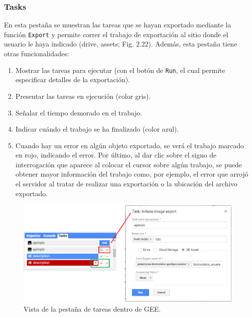 \documentclass[
  12pt,
  letterpaper,
  twoside]{book}
\providecommand{\tightlist}{%
  \setlength{\itemsep}{0pt}\setlength{\parskip}{0pt}}
\begin{document}
\hypertarget{tasks}{%
\subsubsection*{Tasks}\label{tasks}}

En esta pestaña se muestran las tareas que se hayan exportado mediante la función \texttt{Export} y permite correr el trabajo de exportación al sitio donde el usuario le haya indicado (drive, assets; Fig. 2.22). Además, esta pestaña tiene otras funcionalidades:

\begin{enumerate}
\def\labelenumi{\arabic{enumi}.}
\tightlist
\item
  Mostrar las tareas para ejecutar (con el botón de \texttt{Run}, el cual permite especificar detalles de la exportación).
\item
  Presentar las tareas en ejecución (color gris).
\item
  Señalar el tiempo demorado en el trabajo.
\item
  Indicar cuándo el trabajo se ha finalizado (color azul).
\item
  Cuando hay un error en algún objeto exportado, se verá el trabajo marcado en rojo, indicando el error. Por último, al dar clic sobre el signo de interrogación que aparece al colocar el cursor sobre algún trabajo, se puede obtener mayor información del trabajo como, por ejemplo, el error que arrojó el servidor al tratar de realizar una exportación o la ubicación del archivo exportado.
\end{enumerate}

\begin{figure}[btp]

{\centering \includegraphics[width=0.8\linewidth]{Img/task} 

}

\caption{Vista de la pestaña de tareas dentro de GEE.}\label{fig:unnamed-chunk-23}
\end{figure}
\end{document}
